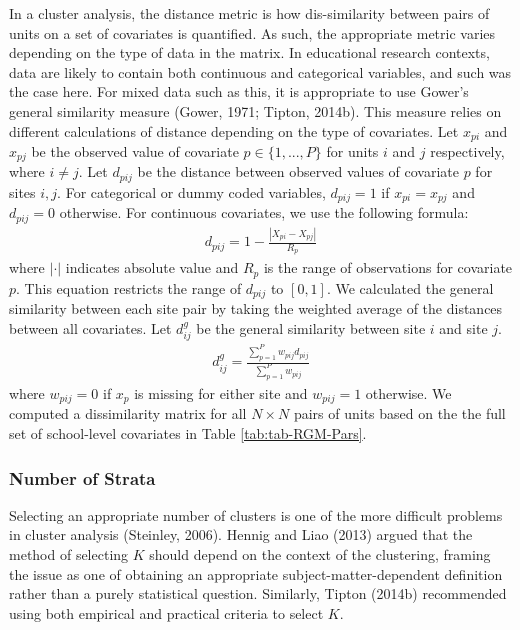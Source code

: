 \documentclass[
  english,
  man,floatsintext]{apa6}
\begin{document}
In a cluster analysis, the distance metric is how dis-similarity between pairs of units on a set of covariates is quantified. As such, the appropriate metric varies depending on the type of data in the matrix.
In educational research contexts, data are likely to contain both continuous and categorical variables, and such was the case here. For mixed data such as this, it is appropriate to use Gower's general similarity measure (Gower, 1971; Tipton, 2014b). This measure relies on different calculations of distance depending on the type of covariates. Let \(x_{pi}\) and \(x_{pj}\) be the observed value of covariate \(p \in \{1, ..., P\}\) for units \(i\) and \(j\) respectively, where \(i \ne j\). Let \(d_{pij}\) be the distance between observed values of covariate \(p\) for sites \(i,j\). For categorical or dummy coded variables, \(d_{pij} = 1\) if \(x_{pi} = x_{pj}\) and \(d_{pij} = 0\) otherwise. For continuous covariates, we use the following formula:
\begin{align}
\label{eq:gowerdist-p}
d_{pij} = 1 - \frac{|X_{pi} - X_{pj}|}{R_p}
\end{align}
where \(|\cdot|\) indicates absolute value and \(R_p\) is the range of observations for covariate \(p\). This equation restricts the range of \(d_{pij}\) to \([0,1]\). We calculated the general similarity between each site pair by taking the weighted average of the distances between all covariates. Let \(d^{g}_{ij}\) be the general similarity between site \(i\) and site \(j\).
\begin{align}
\label{eq:gowerdist}
d^{g}_{ij} = \frac{\sum^P_{p = 1} w_{pij} d_{pij}}{\sum^P_{p = 1} w_{pij}}
\end{align}
where \(w_{pij} = 0\) if \(x_p\) is missing for either site and \(w_{pij} = 1\) otherwise.
We computed a dissimilarity matrix for all \(N \times N\) pairs of units based on the the full set of school-level covariates in Table \ref{tab:tab-RGM-Pars}.

\hypertarget{number-of-strata}{%
\subsubsection{Number of Strata}\label{number-of-strata}}

Selecting an appropriate number of clusters is one of the more difficult problems in cluster analysis (Steinley, 2006). Hennig and Liao (2013) argued that the method of selecting \(K\) should depend on the context of the clustering, framing the issue as one of obtaining an appropriate subject-matter-dependent definition rather than a purely statistical question. Similarly, Tipton (2014b) recommended using both empirical and practical criteria to select \(K\).
\end{document}
